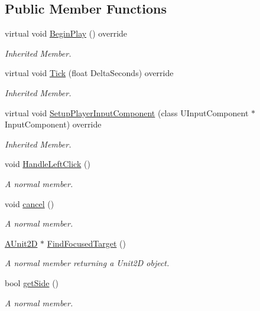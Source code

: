 \subsection*{Public Member Functions}
\begin{DoxyCompactItemize}
\item 
virtual void \hyperlink{class_a_unit2_d_a0251a37e303fe179ac987203df3b4f2f}{Begin\+Play} () override
\begin{DoxyCompactList}\small\item\em Inherited Member. \end{DoxyCompactList}\item 
virtual void \hyperlink{class_a_unit2_d_aabcd72dc2ba9d71a56e58148382607b2}{Tick} (float Delta\+Seconds) override
\begin{DoxyCompactList}\small\item\em Inherited Member. \end{DoxyCompactList}\item 
virtual void \hyperlink{class_a_unit2_d_ae5ce5587eb783da80ed36f7b55724a56}{Setup\+Player\+Input\+Component} (class U\+Input\+Component $\ast$Input\+Component) override
\begin{DoxyCompactList}\small\item\em Inherited Member. \end{DoxyCompactList}\item 
void \hyperlink{class_a_unit2_d_a6a1a7ef96c7efebf5a7f50b011b7a6c0}{Handle\+Left\+Click} ()
\begin{DoxyCompactList}\small\item\em A normal member. \end{DoxyCompactList}\item 
void \hyperlink{class_a_unit2_d_a96e805c919d9088872a5c8945a9ca31f}{cancel} ()
\begin{DoxyCompactList}\small\item\em A normal member. \end{DoxyCompactList}\item 
\hyperlink{class_a_unit2_d}{A\+Unit2D} $\ast$ \hyperlink{class_a_unit2_d_ab9a04722aeaa02b1d656c2ea7c6bdad2}{Find\+Focused\+Target} ()
\begin{DoxyCompactList}\small\item\em A normal member returning a Unit2D object. \end{DoxyCompactList}\item 
bool \hyperlink{class_a_unit2_d_a6426fb6d603a376b3808d558cf07c17e}{get\+Side} ()
\begin{DoxyCompactList}\small\item\em A normal member. \end{DoxyCompactList}\item 

\end{DoxyCompactItemize}
